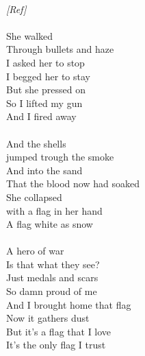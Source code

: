 {\\
\emph{[Ref]}\\
\\
She walked\\
Through bullets and haze\\
I asked her to stop\\
I begged her to stay\\
But she pressed on\\
So I lifted my gun\\
And I fired away\\
\\
And the shells\\
jumped trough the smoke\\
And into the sand\\
That the blood now had soaked\\
She collapsed\\
with a flag in her hand\\
A flag white as snow\\
\\
A hero of war\\
Is that what they see?\\
Just medals and scars\\
So damn proud of me\\
And I brought home that flag\\
Now it gathers dust\\
But it's a flag that I love\\
It's the only flag I trust
}



